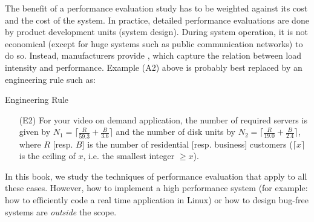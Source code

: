 The benefit of a performance evaluation study has to be weighted
against its cost and the cost of the system. In practice, detailed
performance evaluations are done by product development units
(system design). During system operation, it is not economical
(except for huge systems such as public communication networks) to
do so. Instead, manufacturers provide , which
capture the relation between load intensity and performance. Example
(A2) above is probably best replaced by an engineering rule such as:
\begin{ex}{Engineering Rule}
\begin{itemize}
  \item[(E2)] For your video on demand application, the number of required servers is given by $N_1=\lceil
  \frac{R}{59.3}+\frac{B}{3.6}\rceil$ and the number of disk units by $N_2=\lceil
  \frac{R}{19.0}+\frac{B}{2.4}\rceil$, where $R$ [resp. $B$] is the number of residential [resp.
  business] customers ($\lceil x\rceil$ is the ceiling of $x$, i.e. the smallest integer $\geq x$).
\end{itemize}
\end{ex}
 In this book, we study the techniques of performance evaluation that apply
 to  all these cases. However, how to implement a high performance system
(for example: how to efficiently code a real time application in
Linux) or how to design bug-free systems are \emph{outside} the
scope.

